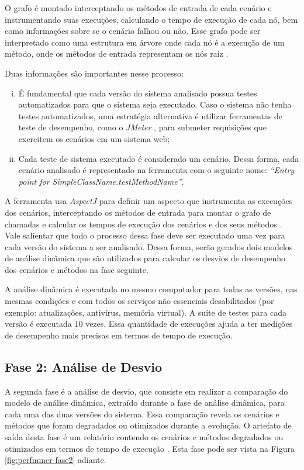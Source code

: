 O grafo é montado interceptando os métodos de entrada de cada cenário e instrumentando suas execuções, calculando o tempo de execução de cada nó, bem como informações sobre se o cenário falhou ou não. Esse grafo pode ser interpretado como uma estrutura em árvore onde cada nó é a execução de um método, onde os métodos de entrada representam os nós raiz \cite{Pinto2015}.

Duas informações são importantes nesse processo:
\begin{enumerate}[(i)]
   \item É fundamental que cada versão do sistema analisado possua testes automatizados para que o sistema seja executado. Caso o sistema não tenha testes automatizados, uma estratégia alternativa é utilizar ferramentas de teste de desempenho, como o \textit{JMeter} \cite{ApacheJMeter2016}, para submeter requisições que exercitem os cenários em um sistema web;
   \item Cada teste de sistema executado é considerado um cenário. Dessa forma, cada cenário analisado é representado na ferramenta com o seguinte nome: \textit{``Entry point for SimpleClassName.testMethodName''}.
\end{enumerate}

A ferramenta usa \textit{AspectJ} para definir um aspecto que instrumenta as execuções dos cenários, interceptando os métodos de entrada para montar o grafo de chamadas e calcular os tempos de execução dos cenários e dos seus métodos \cite{Pinto2015}. Vale salientar que todo o processo dessa fase deve ser executado uma vez para cada versão do sistema a ser analisado. Dessa forma, serão gerados dois modelos de análise dinâmica que são utilizados para calcular os desvios de desempenho dos cenários e métodos na fase seguinte.

A análise dinâmica é executada no mesmo computador para todas as versões, nas mesmas condições e com todos os serviços não essenciais desabilitados (por exemplo: atualizações, antivírus, memória virtual). A suíte de testes para cada versão é executada 10 vezes. Essa quantidade de execuções ajuda a ter medições de desempenho mais precisas em termos de tempo de execução.

\subsection{Fase 2: Análise de Desvio} \label{subsec:fase2}

A segunda fase é a análise de desvio, que consiste em realizar a comparação do modelo de análise dinâmica, extraído durante a fase de análise dinâmica, para cada uma das duas versões do sistema. Essa comparação revela os cenários e métodos que foram degradados ou otimizados durante a evolução. O artefato de saída desta fase é um relatório contendo os cenários e métodos degradados ou otimizados em termos de tempo de execução \cite{Pinto2015}. Esta fase pode ser vista na Figura \ref{fig:perfminer-fase2} adiante.

